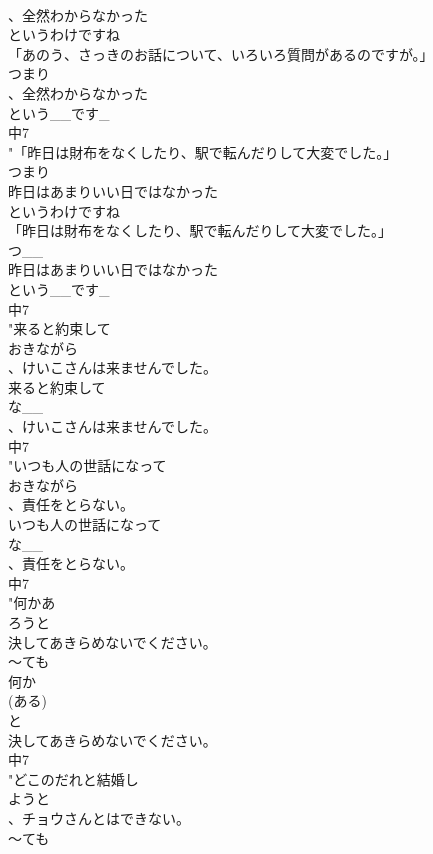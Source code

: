 \documentclass[8pt]{extreport}
\begin{document}
\begin{CJK}{UTF8}{min}
\\	、全然わからなかった
\\	というわけですね
\\	「あのう、さっきのお話について、いろいろ質問があるのですが。」
\\	つまり
\\	、全然わからなかった
\\	という__です_
\\	中7
\\	"「昨日は財布をなくしたり、駅で転んだりして大変でした。」
\\	つまり
\\	昨日はあまりいい日ではなかった
\\	というわけですね
\\	「昨日は財布をなくしたり、駅で転んだりして大変でした。」
\\	つ__
\\	昨日はあまりいい日ではなかった
\\	という__です_
\\	中7
\\	"来ると約束して
\\	おきながら
\\	、けいこさんは来ませんでした。
\\	来ると約束して
\\	な__
\\	、けいこさんは来ませんでした。
\\	中7
\\	"いつも人の世話になって
\\	おきながら
\\	、責任をとらない。
\\	いつも人の世話になって
\\	な__
\\	、責任をとらない。
\\	中7
\\	"何かあ
\\	ろうと
\\	決してあきらめないでください。
\\	～ても	
\\	何か
\\	(ある)
\\	と
\\	決してあきらめないでください。
\\	中7
\\	"どこのだれと結婚し
\\	ようと
\\	、チョウさんとはできない。
\\	～ても	

\end{CJK}
\end{document}
